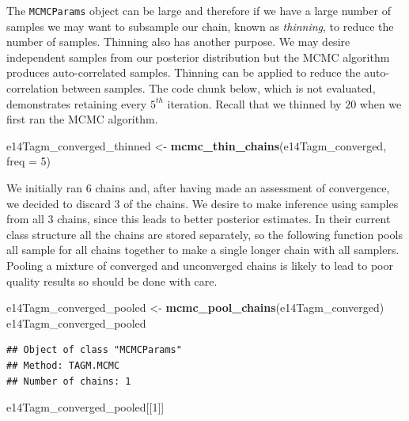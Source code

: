 \documentclass[
]{article}
\newenvironment{Shaded}{\begin{snugshade}}{\end{snugshade}}
\newcommand{\DataTypeTok}[1]{\textcolor[rgb]{0.13,0.29,0.53}{#1}}
\newcommand{\DecValTok}[1]{\textcolor[rgb]{0.00,0.00,0.81}{#1}}
\newcommand{\KeywordTok}[1]{\textcolor[rgb]{0.13,0.29,0.53}{\textbf{#1}}}
\newcommand{\NormalTok}[1]{#1}
\newcommand{\StringTok}[1]{\textcolor[rgb]{0.31,0.60,0.02}{#1}}
\begin{document}
The \texttt{MCMCParams} object can be large and therefore if we have a
large number of samples we may want to subsample our chain, known as
\emph{thinning}, to reduce the number of samples. Thinning also has
another purpose. We may desire independent samples from our posterior
distribution but the MCMC algorithm produces auto-correlated samples.
Thinning can be applied to reduce the auto-correlation between samples.
The code chunk below, which is not evaluated, demonstrates retaining
every \(5^{th}\) iteration. Recall that we thinned by \(20\) when we
first ran the MCMC algorithm.

\begin{Shaded}
\begin{Highlighting}[]
\NormalTok{e14Tagm_converged_thinned <-}\StringTok{ }\KeywordTok{mcmc_thin_chains}\NormalTok{(e14Tagm_converged, }\DataTypeTok{freq  =} \DecValTok{5}\NormalTok{)}
\end{Highlighting}
\end{Shaded}

We initially ran \(6\) chains and, after having made an assessment of
convergence, we decided to discard \(3\) of the chains. We desire to
make inference using samples from all \(3\) chains, since this leads to
better posterior estimates. In their current class structure all the
chains are stored separately, so the following function pools all sample
for all chains together to make a single longer chain with all samplers.
Pooling a mixture of converged and unconverged chains is likely to lead
to poor quality results so should be done with care.

\begin{Shaded}
\begin{Highlighting}[]
\NormalTok{e14Tagm_converged_pooled <-}\StringTok{ }\KeywordTok{mcmc_pool_chains}\NormalTok{(e14Tagm_converged)}
\NormalTok{e14Tagm_converged_pooled}
\end{Highlighting}
\end{Shaded}

\begin{verbatim}
## Object of class "MCMCParams"
## Method: TAGM.MCMC 
## Number of chains: 1
\end{verbatim}

\begin{Shaded}
\begin{Highlighting}[]
\NormalTok{e14Tagm_converged_pooled[[}\DecValTok{1}\NormalTok{]]}
\end{Highlighting}
\end{Shaded}
\end{document}
